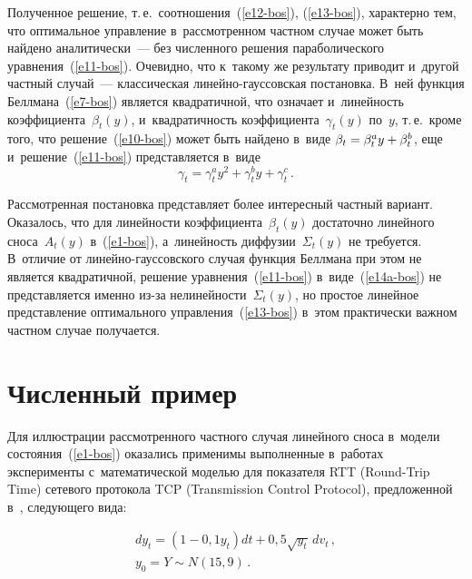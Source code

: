 \begin{multicols}{2}
     Полученное решение, т.\,е.\ соотношения~(\ref{e12-bos}),  
(\ref{e13-bos}), характерно тем, что оптимальное управление 
в~рассмотренном частном случае может быть найде\-но аналитически~--- 
без численного решения параболического уравнения~(\ref{e11-bos}). 
Очевидно, что к~такому же результату приводит и~другой частный  
случай~--- классическая ли\-ней\-но-гаус\-сов\-ская постановка. В~ней 
функция Беллмана~(\ref{e7-bos}) является квадратичной, что означает 
и~линейность коэффициента~$\beta_t(y)$, и~квадратичность 
коэффициента~$\gamma_t(y)$ по~$y$, т.\,е.\ кроме того, что 
решение~(\ref{e10-bos}) может быть найдено в~виде $\beta_t\hm= \beta_t^a y 
\hm+ \beta_t^b$, еще и~решение~(\ref{e11-bos}) представляется в~виде 
\begin{equation}
\gamma_t= \gamma_t^a y^2 + \gamma_t^b y + \gamma_t^c\,. 
\label{e14a-bos}
\end{equation}

\pagebreak
     
     Рассмотренная постановка представляет более интересный частный 
вариант. Оказалось, что для линейности коэффициента~$\beta_t(y)$ 
достаточно линейного сноса~$A_t(y)$ в~(\ref{e1-bos}), а~линейность 
диффузии~$\Sigma_t(y)$ не требуется. В~отличие от  
ли\-ней\-но-гаус\-сов\-ско\-го случая функция Беллмана при этом не является 
квадратичной, решение уравнения~(\ref{e11-bos}) в~виде~(\ref{e14a-bos})
 не представляется 
именно из-за нелинейности~$\Sigma_t(y)$, но простое линейное 
представление оптимального управления~(\ref{e13-bos}) в~этом практически 
важном частном случае получается.

\vspace*{-5pt}
     
\section{Численный пример}

     Для иллюстрации рассмотренного частного случая линейного сноса 
в~модели состояния~(\ref{e1-bos}) оказались применимы выполненные 
в~работах~\cite{2-bos, 4-bos} эксперименты с~математической моделью для 
показателя RTT (Round-Trip Time) сетевого протокола TCP (Transmission 
Control Protocol), предложенной в~\cite{8-bos}, следующего вида:

\vspace*{-3pt}

\noindent
     \begin{multline}
     dy_t=\left( 1-0{,}1 y_t\right) dt +0{,}5\sqrt{y_t}\,dv_t\,,\\
      y_0=Y\sim 
N(15{,}9)\,.
     \label{e14-bos}
     \end{multline}
     

\end{multicols}
